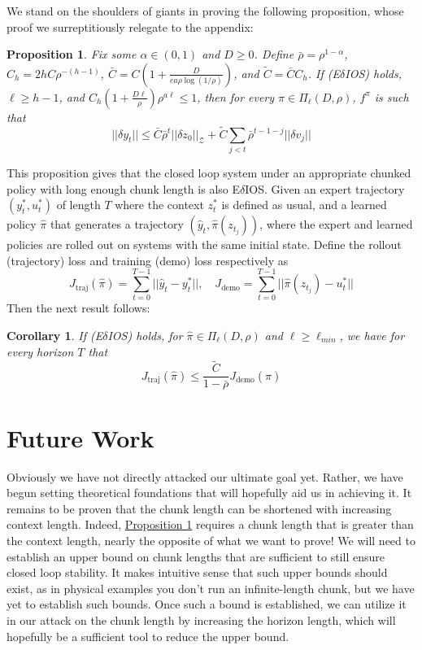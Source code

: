 \documentclass{l4dc2026}
\newcommand{\lp}{\left(}
\newcommand{\rp}{\right)}
\newcommand{\f}[2]{\frac{#1}{#2}}
\newcommand{\lm}{\limits}
\newtheorem{prop}{Proposition}
\newtheorem{corollary2}{Corollary}
\begin{document}
We stand on the shoulders of giants in proving the following proposition, whose proof we surreptitiously relegate to the appendix: 
\begin{prop}\label{edeltaiosprop}
    Fix some $\alpha \in (0, 1)$ and $D \ge 0$. Define $\bar\rho = \rho^{1 - \alpha}$, $C_h = 2hC\rho^{-(h-1)}$, $\bar C = C\lp1 + \f{D}{ea\rho\log(1/\rho)}\rp$, and $\tilde C = \bar CC_h$. If (E$\delta$IOS) holds, $\ell \ge h - 1$, and $C_h\lp1 + \f{D\ell}{\rho}\rp\rho^{a\ell} \le 1$, then for every $\pi \in \Pi_\ell(D, \rho)$, $f^\pi$ is such that \[||\delta y_t|| \le \bar{C} \bar\rho^t||\delta z_0||_\mathcal{Z} + \tilde{C}\sum\lm_{j < t}\bar\rho^{t-1-j}||\delta v_j||\]
\end{prop}
This proposition gives that the closed loop system under an appropriate chunked policy with long enough chunk length is also E$\delta$IOS. Given an expert trajectory $(y^*_t, u^*_t)$ of length $T$ where the context $z^*_t $ is defined as usual, and a learned policy $\hat\pi$ that generates a trajectory $(\hat{y}_t, \hat\pi(z_{t_j}))$, where the expert and learned policies are rolled out on systems with the same initial state.
Define the rollout (trajectory) loss and training (demo) loss respectively as \[J_{\text{traj}}(\hat\pi) = \sum\lm_{t = 0}^{T-1}||\hat{y}_t - y^*_t||, \quad J_\text{demo} = \sum\lm_{t = 0}^{T-1}||\hat\pi(z_{t_j}) - u^*_t||\]
Then the next result follows:
\begin{corollary2}\label{boundcorollary}
    If (E$\delta$IOS) holds, for $\hat\pi \in \Pi_\ell(D, \rho)$ and $\ell \ge \ell_{min}$, we have for every horizon $T$ that \[J_\text{traj}(\hat\pi) \le \f{\tilde{C}}{1 - \bar\rho}J_\text{demo}(\hat\pi)\]
\end{corollary2}

\section{Future Work}
Obviously we have not directly attacked our ultimate goal yet. Rather, we have begun setting theoretical foundations that will hopefully aid us in achieving it. It remains to be proven that the chunk length can be shortened with increasing context length. Indeed, \hyperref[edeltaiosprop]{Proposition 1} requires a chunk length that is greater than the context length, nearly the opposite of what we want to prove! We will need to establish an upper bound on chunk lengths that are sufficient to still ensure closed loop stability. It makes intuitive sense that such upper bounds should exist, as in physical examples you don't run an infinite-length chunk, but we have yet to establish such bounds. Once such a bound is established, we can utilize it in our attack on the chunk length by increasing the horizon length, which will hopefully be a sufficient tool to reduce the upper bound.
\end{document}

